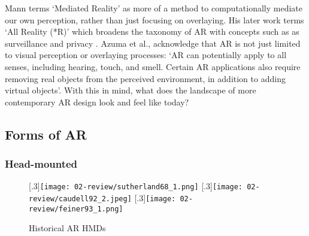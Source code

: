 Mann terms `Mediated Reality' \citeyearpar{mann1994} as more of a method to computationally mediate our own perception, rather than just focusing on overlaying. His later work terms `All Reality (*R)' which broadens the taxonomy of AR with concepts such as as surveillance and privacy \citeyearpar{mann2018}. Azuma et al., acknowledge that AR is not just limited to visual perception or overlaying processes: `AR can potentially apply to all senses, including hearing, touch, and smell. Certain AR applications also require removing real objects from the perceived environment, in addition to adding virtual objects'. With this in mind, what does the landscape of more contemporary AR design look and feel like today?


\subsection{Forms of AR}\label{sec: literature-interface-forms}
\subsubsection{Head-mounted}\label{sec: literature-interface-forms-hmd}
\begin{figure}
    \centering
    [.3\linewidth]{\texttt{[image: 02-review/sutherland68\_1.png]}}
    \hfill
    [.3\linewidth]{\texttt{[image: 02-review/caudell92\_2.jpeg]}}
    \hfill
    [.3\linewidth]{\texttt{[image: 02-review/feiner93\_1.png]}}%
    \caption{Historical AR HMDs}
    \label{fig: historicalHMDs}
\end{figure}

